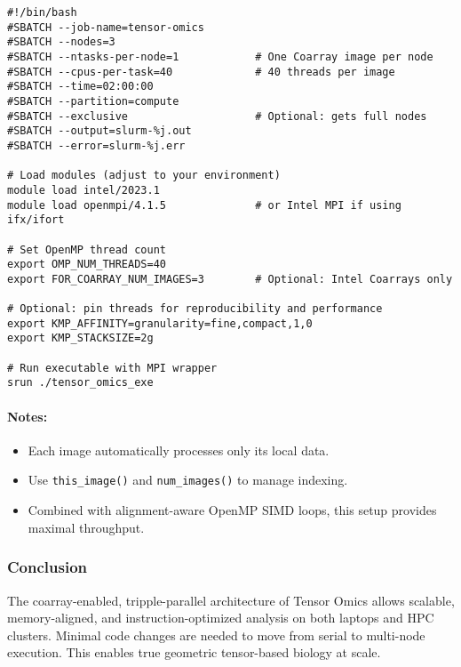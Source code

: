 \documentclass{article}
\begin{document}
\begin{verbatim}
#!/bin/bash
#SBATCH --job-name=tensor-omics
#SBATCH --nodes=3
#SBATCH --ntasks-per-node=1            # One Coarray image per node
#SBATCH --cpus-per-task=40             # 40 threads per image
#SBATCH --time=02:00:00
#SBATCH --partition=compute
#SBATCH --exclusive                    # Optional: gets full nodes
#SBATCH --output=slurm-%j.out
#SBATCH --error=slurm-%j.err

# Load modules (adjust to your environment)
module load intel/2023.1
module load openmpi/4.1.5              # or Intel MPI if using ifx/ifort

# Set OpenMP thread count
export OMP_NUM_THREADS=40
export FOR_COARRAY_NUM_IMAGES=3        # Optional: Intel Coarrays only

# Optional: pin threads for reproducibility and performance
export KMP_AFFINITY=granularity=fine,compact,1,0
export KMP_STACKSIZE=2g

# Run executable with MPI wrapper
srun ./tensor_omics_exe
\end{verbatim}

\paragraph{Notes:}
\begin{itemize}
\item Each image automatically processes only its local data.
\item Use \texttt{this\_image()} and \texttt{num\_images()} to manage indexing.
\item Combined with alignment-aware OpenMP SIMD loops, this setup provides maximal throughput.
\end{itemize}

\subsubsection{Conclusion}
The coarray-enabled, tripple-parallel architecture of Tensor Omics allows scalable, memory-aligned, and instruction-optimized analysis on both laptops and HPC clusters. Minimal code changes are needed to move from serial to multi-node execution. This enables true geometric tensor-based biology at scale.
\end{document}
